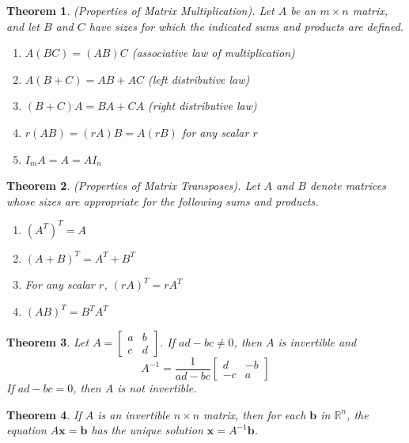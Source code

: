 \documentclass{article}
\theoremstyle{plain}
\newtheorem{thm}{Theorem}[section]
\theoremstyle{definition}
\theoremstyle{remark}
\begin{document}
\begin{thm} (Properties of Matrix Multiplication).
    Let $A$ be an $m\times n$ matrix, and let $B$ and $C$ have sizes for which the indicated sums and products are defined.
    \begin{enumerate}
        \item[a.] $A(BC)=(AB)C$ \hfill(associative law of multiplication)
        \item[b.] $A(B+C)=AB+AC$ \hfill(left distributive law)
        \item[c.] $(B+C)A=BA+CA$ \hfill(right distributive law)
        \item[d.] $r(AB)=(rA)B=A(rB)$ \hfill for any scalar $r$
        \item[e.] $I_mA=A=AI_n$
    \end{enumerate}
\end{thm}

\begin{thm} (Properties of Matrix Transposes).
    Let $A$ and $B$ denote matrices whose sizes are appropriate for the following sums and products.
    \begin{enumerate}
        \item[a.] $(A^T)^T=A$
        \item[b.] $(A+B)^T=A^T+B^T$
        \item[c.] For any scalar $r$, $(rA)^T=rA^T$
        \item[d.] $(AB)^T=B^TA^T$
    \end{enumerate}
\end{thm}

\begin{thm}
    Let $A=\begin{bmatrix}
        a & b\\
        c & d
    \end{bmatrix}$. If $ad-bc\neq0$, then $A$ is invertible and $$A^{-1}=\frac{1}{ad-bc}\begin{bmatrix}
        d & -b\\
        -c & a
    \end{bmatrix}$$ If $ad-bc=0$, then $A$ is not invertible.
\end{thm}

\begin{thm}
    If $A$ is an invertible $n\times n$ matrix, then for each $\textbf{b}$ in $\mathbb{R}^n$, the equation $A\textbf{x}=\textbf{b}$ has the unique solution $\textbf{x}=A^{-1}\textbf{b}$.
\end{thm}
\end{document}
